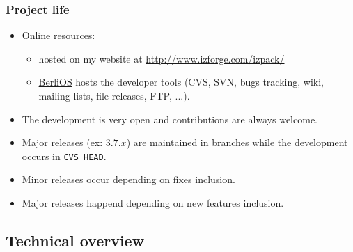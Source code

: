 \documentclass{beamer}
\begin{document}

\begin{frame}

\frametitle{Project life}

\begin{itemize}

  \item Online resources:
    \begin{itemize}
      \item hosted on my website at
      \href{http://www.izforge.com/izpack/}{\url{http://www.izforge.com/izpack/}}

      \item \href{http://www.berlios.de/}{BerliOS} hosts the developer tools
      (CVS, SVN, bugs tracking, wiki, mailing-lists, file releases, FTP, ...).
    \end{itemize}

    \item The development is very open and contributions are always welcome.

    \item Major releases (ex: $3.7.x$) are maintained in branches while the
    development occurs in \texttt{CVS HEAD}.

    \item Minor releases occur depending on fixes inclusion.

    \item Major releases happend depending on new features inclusion.

\end{itemize}

\end{frame}


\subsection{Technical overview}
\end{document}
